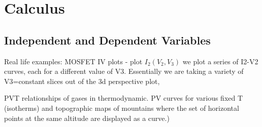 
\chapter{Calculus}


\section{Independent and Dependent Variables}


Real life examples:
MOSFET IV plots - plot $I_2(V_2,V_3)$
we plot a series of I2-V2 curves, each for a different value of V3. 
Essentially we are taking a variety of V3=constant slices out of the 3d perspective plot,

PVT relationships of gases in thermodynamic.
PV curves for various fixed T (isotherms) and topographic maps of mountains 
where the set of horizontal points at the same altitude are displayed as a curve.)





